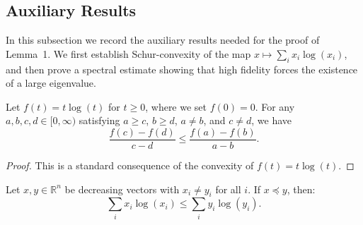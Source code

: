 \subsection*{Auxiliary Results}

\noindent In this subsection we record the auxiliary results needed for the proof of Lemma~1. 
We first establish Schur-convexity of the map $x \mapsto \sum_i x_i \log(x_i)$, and then prove a spectral estimate showing that high fidelity forces the existence of a large eigenvalue.

\begin{proposition}
\label{lem:slope_comparison}
\leanok
Let $f(t) = t \log(t)$ for $t \geq 0$, where we set $f(0) = 0$. For any $a, b, c, d \in [0,\infty)$ satisfying $a \geq c$, $b \geq d$, $a \neq b$, and $c \neq d$, we have
$$\frac{f(c) - f(d)}{c - d} \leq \frac{f(a) - f(b)}{a - b}.$$
\end{proposition}

\begin{proof}
This is a standard consequence of the convexity of $f(t) = t \log(t)$.
\end{proof}

\begin{proposition}
\label{lem:schur_reduction}
\leanok
{}
Let $x, y \in \mathbb{R}^n$ be decreasing vectors with $x_i \neq y_i$ for all $i$. 
If $x \preceq y$, then:
$$\sum_i x_i \log(x_i) \leq \sum_i y_i \log(y_i).$$
\end{proposition}

